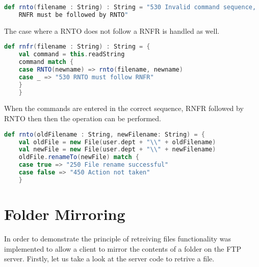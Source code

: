 \begin{lstlisting}[language=Scala, showstringspaces=false]
	def rnto(filename : String) : String = "530 Invalid command sequence,
	RNFR must be followed by RNTO"

\end{lstlisting}

The case where a RNTO does not follow a RNFR is handled as well.

\begin{lstlisting}[language=Scala, caption=Rename error checking, showstringspaces=false, tabsize=2]
	def rnfr(filename : String) : String = {
	val command = this.readString
	command match {
	case RNTO(newname) => rnto(filename, newname)
	case _ => "530 RNTO must follow RNFR"
	}
	}
\end{lstlisting}

When the commands are entered in the correct sequence, RNFR followed by RNTO then then
the operation can be performed.

\begin{lstlisting}[language=Scala, caption=File rename operation, showstringspaces=false, tabsize=2]
	def rnto(oldFilename : String, newFilename: String) = {
	val oldFile = new File(user.dept + "\\" + oldFilename)
	val newFile = new File(user.dept + "\\" + newFilename)
	oldFile.renameTo(newFile) match {
	case true => "250 File rename successful"
	case false => "450 Action not taken"
	}

\end{lstlisting}




\section{Folder Mirroring}

In order to demonstrate the principle of retreiving files functionality
was implemented to allow a client to mirror the contents of a folder on the FTP server.
Firstly, let us take a look at the server code to retrive a file.

